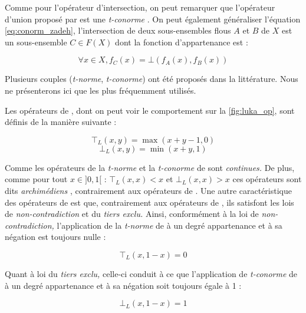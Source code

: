 Comme pour l'opérateur d'intersection, on peut remarquer que
l'opérateur d'union proposé par \textcite{Zadeh1965} est une
\emph{t-conorme} \autocite{Bouchon-Meunier2007}. On peut également
généraliser l'équation \ref{eq:conorm_zadeh}, l'intersection de deux
sous-ensembles flous \(A\) et \(B\) de \(X\) est un sous-ensemble
\(C ∈ F(X)\) dont la fonction d’appartenance est :

\begin{equation}
     ∀x ∈ X, f_C (x) = ⊥(f_A(x), f_B(x))  
\end{equation}

Plusieurs couples (\emph{t-norme}, \emph{t-conorme}) ont été proposés
dans la littérature. Nous ne présenterons ici que les plus fréquemment
utilisés. 

Les opérateurs de , dont on peut voir le comportement sur
la \autoref{fig:luka_op}, sont définis de la manière suivante :

\begin{equation}
  \label{eq:norm_luka}
  ⊤_L(x,y) = \max(x + y - 1, 0) 
\end{equation}
%
\begin{equation}
  \label{eq:conorm_luka}
  ⊥_L(x,y) = \min(x + y, 1)
\end{equation}

Comme les opérateurs de \textcite{Zadeh1965} la \emph{t-norme} et la
\emph{t-conorme} de  sont \emph{continues.} De plus,
comme pour tout \(x \in ]0,1[\) : \(⊤_L(x,x) < x\) et
\( ⊥_L(x,x) > x\) ces opérateurs sont dits \emph{archimédiens}
\autocite{Bouchon-Meunier1995}, contrairement aux opérateurs de
\textcite{Zadeh1965}. Une autre caractéristique des opérateurs de
 est que, contrairement aux opérateurs de
\textcite{Zadeh1965}, ils satisfont les lois de
\emph{non-contradiction} et du \emph{tiers exclu.} Ainsi, conformément
à la loi de \emph{non-contradiction,} l’application de la
\emph{t-norme} de  à un degré appartenance et à sa
négation est toujours nulle :

\begin{equation}
  ⊤_L(x,1-x) = 0
\end{equation}

Quant à loi du \emph{tiers exclu,} celle-ci conduit à ce que
l’application de \emph{t-conorme} de  à un degré
appartenance et à sa négation soit toujours égale à 1 :
 
\begin{equation}
  ⊥_L(x,1-x) = 1
\end{equation}

